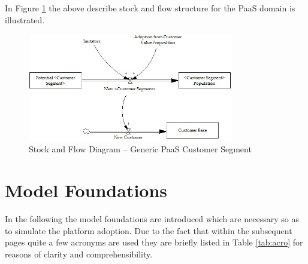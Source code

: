 In Figure \ref{fig:sfd_cs} the above describe stock and flow structure for the \ac{PaaS} domain is illustrated.

\begin{figure}[tb]
	\centering
	\includegraphics[width=0.8\textwidth]{gfx/sfd_customerSegment}
	\caption{Stock and Flow Diagram -- Generic PaaS Customer Segment}
	\label{fig:sfd_cs}
\end{figure}

\section{Model Foundations}\label{ch:sfd:mf}
In the following the model foundations are introduced which are necessary so as to simulate the platform adoption. Due to the fact that within the subsequent pages quite a few acronyms are used they are briefly listed in Table \ref{tab:acro} for reasons of clarity and comprehensibility.

